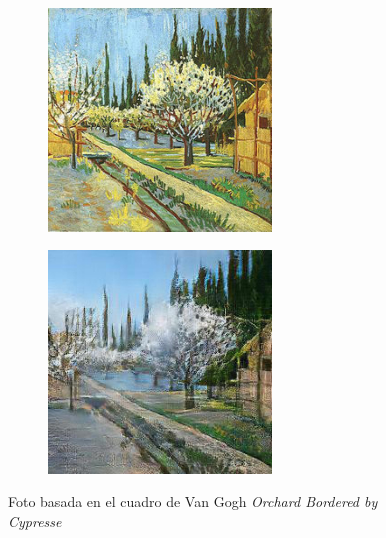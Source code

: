 \documentclass[[../main.tex]{subfiles}
\begin{document}
        \begin{figure}[!htb]
            \begin{subfigure}[b]{0.49\textwidth}
            \includegraphics[width=0.65\textwidth]{imagenes/cuadro2imagen/vangogh/00102.jpg}
            \end{subfigure}
        \hfill
            \begin{subfigure}[b]{0.49\textwidth}
            \includegraphics[width=0.65\textwidth]{imagenes/cuadro2imagen/vangogh/00102_2.jpg}
            \end{subfigure}
        \caption{Foto basada en el cuadro de Van Gogh \textit{Orchard Bordered by Cypresse}}
        \label{fig:vangogh_foto_cypresse}
        \end{figure}
        
\end{document}
